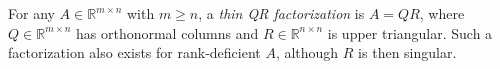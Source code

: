 
For any $A\in\mathbb R^{m\times n}$ with $m\ge n$, a \emph{thin QR factorization} is $A=QR$, where $Q\in\mathbb R^{m\times n}$ has orthonormal columns and $R\in\mathbb R^{n\times n}$ is upper triangular. Such a factorization also exists for rank-deficient $A$, although $R$ is then singular.
